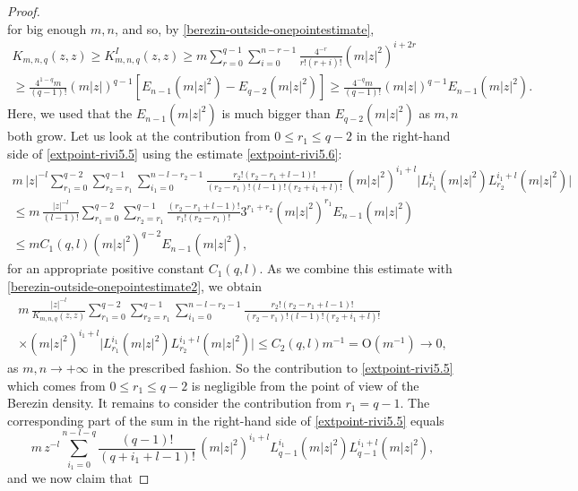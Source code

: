 \documentclass{birkart}
\theoremstyle{definition}
\theoremstyle{remark}
\numberwithin{equation}{section}
\numberwithin{figure}{section}
\newcommand{\1}{{\mathbf 1}}
\newcommand{\Rpar}{q}
\newcommand{\Ordo}{\mathrm{O}}
\begin{document}
\begin{proof}
\[\]
for big enough $m,n$, and so, by \eqref{berezin-outside-onepointestimate},
\begin{multline} 
\label{berezin-outside-onepointestimate2}
K_{m,n,\Rpar}(z,z) \geq K^{I}_{m,n,\Rpar}(z,z)
\ge m\sum_{r=0}^{\Rpar-1} \sum_{i=0}^{n-r-1} \frac{4^{-r}}{r!(r+i)!} 
(m|z|^2)^{i+2r} 
\\
\ge\frac{4^{1-q}m}{(q-1)!}(m|z|)^{q-1}[E_{n-1}(m|z|^2)-
E_{q-2}(m|z|^2)]\ge\frac{4^{-q}m}{(q-1)!}(m|z|)^{q-1}E_{n-1}(m|z|^2).
\end{multline}
Here, we used that the $E_{n-1}(m|z|^2)$ is much bigger than $E_{q-2}(m|z|^2)$ 
as $m,n$ both grow. Let us look at the contribution from $0\le r_1\le q-2$
in the right-hand side of \eqref{extpoint-rivi5.5} using the estimate
\eqref{extpoint-rivi5.6}:
\begin{multline*}
m\,|z|^{-l}
\sum_{r_1=0}^{\Rpar-2}\sum_{r_2=r_1}^{\Rpar-1}\sum_{i_1=0}^{n-l-r_2-1}
\frac{r_2!(r_2-r_1+l-1)!}{(r_2-r_1)!(l-1)!(r_2+i_1+l)!}
\,(m|z|^{2})^{i_1+l}\big|L_{r_1}^{i_1}(m|z|^2)L^{i_1+l}_{r_2}(m|z|^2)\big|
\\
\le 
m\,\frac{|z|^{-l}}{(l-1)!}\sum_{r_1=0}^{\Rpar-2}\sum_{r_2=r_1}^{\Rpar-1}
\frac{(r_2-r_1+l-1)!}{r_1!(r_2-r_1)!}3^{r_1+r_2}(m|z|^2)^{r_1}E_{n-1}(m|z|^2)
\\
\le m C_1(q,l)(m|z|^2)^{q-2}E_{n-1}(m|z|^2),
\end{multline*}
for an appropriate positive constant $C_1(q,l)$. As we combine this estimate
with \eqref{berezin-outside-onepointestimate2}, we obtain
\begin{multline*}
m\,\frac{|z|^{-l}}{K_{m,n,q}(z,z)}
\sum_{r_1=0}^{\Rpar-2}\sum_{r_2=r_1}^{\Rpar-1}\sum_{i_1=0}^{n-l-r_2-1}
\frac{r_2!(r_2-r_1+l-1)!}{(r_2-r_1)!(l-1)!(r_2+i_1+l)!}
\\
\times(m|z|^{2})^{i_1+l}\big|L_{r_1}^{i_1}(m|z|^2)L^{i_1+l}_{r_2}(m|z|^2)\big|
\le C_2(q,l)m^{-1}=\Ordo(m^{-1})\longrightarrow0,
\end{multline*}
as $m,n\to+\infty$ in the prescribed fashion. So the contribution to
\eqref{extpoint-rivi5.5} which comes from $0\le r_1\le q-2$ is negligible
from the point of view of the Berezin density. It remains to consider the 
contribution from $r_1=q-1$. The corresponding part of the sum in the
right-hand side of \eqref{extpoint-rivi5.5} equals
\begin{equation*}
m\,z^{-l}
\sum_{i_1=0}^{n-l-q}
\frac{(q-1)!}{(q+i_1+l-1)!}
\,(m|z|^{2})^{i_1+l}L_{q-1}^{i_1}(m|z|^2)L^{i_1+l}_{q-1}(m|z|^2),
\end{equation*}
and we now claim that

\end{proof}
\end{document}
